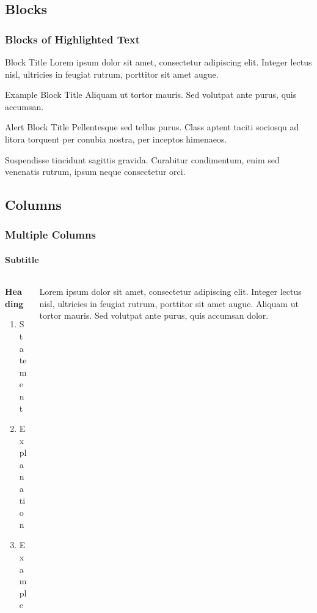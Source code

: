 \documentclass[
	10pt, %
]{beamer}
\begin{document}

\subsection{Blocks}

\begin{frame}
	\frametitle{Blocks of Highlighted Text}

	\begin{block}{Block Title}
		Lorem ipsum dolor sit amet, consectetur adipiscing elit. Integer lectus nisl, ultricies in feugiat rutrum, porttitor sit amet augue.
	\end{block}

	\begin{exampleblock}{Example Block Title}
		Aliquam ut tortor mauris. Sed volutpat ante purus, quis accumsan.
	\end{exampleblock}

	\begin{alertblock}{Alert Block Title}
		Pellentesque sed tellus purus. Class aptent taciti sociosqu ad litora torquent per conubia nostra, per inceptos himenaeos.
	\end{alertblock}

	\begin{block}{} %
		Suspendisse tincidunt sagittis gravida. Curabitur condimentum, enim sed venenatis rutrum, ipsum neque consectetur orci.
	\end{block}
\end{frame}


\subsection{Columns}

\begin{frame}
	\frametitle{Multiple Columns}
	\framesubtitle{Subtitle} %

	\begin{columns}[c] %
		\begin{column}{0.45\textwidth} %
			\textbf{Heading}
			\begin{enumerate}
				\item Statement
				\item Explanation
				\item Example
			\end{enumerate}
		\end{column}
		\begin{column}{0.5\textwidth} %
			Lorem ipsum dolor sit amet, consectetur adipiscing elit. Integer lectus nisl, ultricies in feugiat rutrum, porttitor sit amet augue. Aliquam ut tortor mauris. Sed volutpat ante purus, quis accumsan dolor.
		\end{column}
	\end{columns}
\end{frame}
\end{document}
